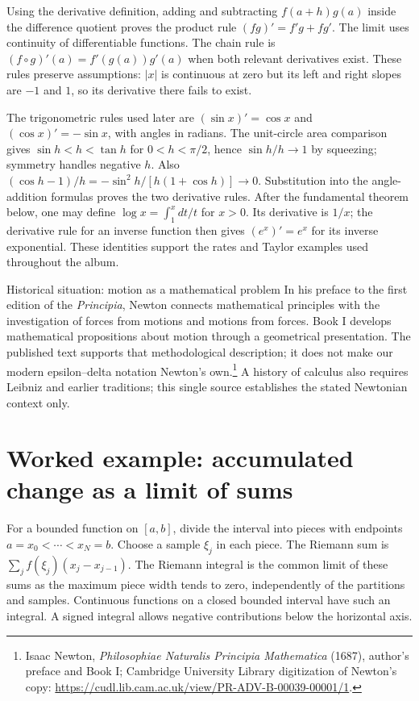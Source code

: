 Using the derivative definition, adding and subtracting
$f(a+h)g(a)$ inside the difference quotient proves the product rule
$(fg)'=f'g+fg'$. The limit uses continuity of differentiable functions.
The chain rule is $(f\circ g)'(a)=f'(g(a))g'(a)$ when both relevant
derivatives exist. These rules preserve assumptions: $|x|$ is continuous
at zero but its left and right slopes are $-1$ and $1$, so its derivative
there fails to exist.

The trigonometric rules used later are $(\sin x)'=\cos x$ and
$(\cos x)'=-\sin x$, with angles in radians. The unit-circle area
comparison gives $\sin h<h<\tan h$ for $0<h<\pi/2$, hence
$\sin h/h\to1$ by squeezing; symmetry handles negative $h$.
Also $(\cos h-1)/h=-\sin^2h/[h(1+\cos h)]\to0$.
Substitution into the angle-addition formulas proves the two derivative
rules. After the fundamental theorem below, one may define
$\log x=\int_1^x dt/t$ for $x>0$. Its derivative is $1/x$;
the derivative rule for an inverse function then gives
$(e^x)'=e^x$ for its inverse exponential. These identities support the
rates and Taylor examples used throughout the album.

\begin{learningcard}[breakable=false]{Historical situation: motion as a mathematical problem}
In his preface to the first edition of the \emph{Principia}, Newton
connects mathematical principles with the investigation of forces from
motions and motions from forces. Book I develops mathematical propositions
about motion through a geometrical presentation. The published text supports
that methodological description; it does not make our modern epsilon--delta
notation Newton's own.\footnote{Isaac Newton, \emph{Philosophiae Naturalis
Principia Mathematica} (1687), author's preface and Book I; Cambridge
University Library digitization of Newton's copy:
\url{https://cudl.lib.cam.ac.uk/view/PR-ADV-B-00039-00001/1}.}
A history of calculus also requires Leibniz and earlier traditions; this
single source establishes the stated Newtonian context only.
\end{learningcard}

\section{Worked example: accumulated change as a limit of sums}
For a bounded function on $[a,b]$, divide the interval into pieces with
endpoints $a=x_0<\cdots<x_N=b$. Choose a sample $\xi_j$ in each piece.
The Riemann sum is $\sum_j f(\xi_j)(x_j-x_{j-1})$. The Riemann integral
is the common limit of these sums as the maximum piece width tends to zero,
independently of the partitions and samples. Continuous functions on a closed
bounded interval have such an integral. A signed integral allows negative
contributions below the horizontal axis.

